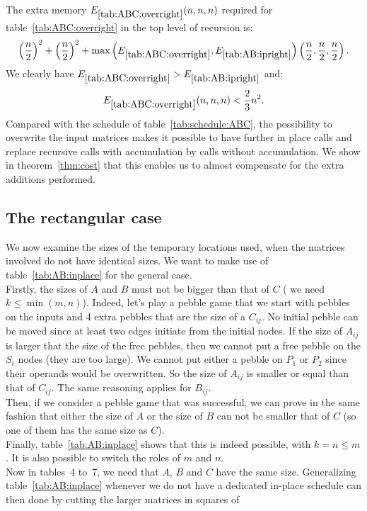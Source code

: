 \documentclass{article}
\renewcommand{\leq}{\leqslant}
\begin{document}
The extra memory $E_{\ref{tab:ABC:overright}}(n,n,n)$ required for table~\ref{tab:ABC:overright} in the top level of recursion is:
$$
\left(\frac{n}{2}\right)^2 + \left(\frac{n}{2}\right)^2 + \max{\left(E_{\ref{tab:ABC:overright}},E_{\ref{tab:AB:ipright}}\right)}\left(\frac{n}{2},\frac{n}{2},\frac{n}{2}\right).
$$
We clearly have $E_{\ref{tab:ABC:overright}}>E_{\ref{tab:AB:ipright}}$ and:  
$$
E_{\ref{tab:ABC:overright}}(n,n,n) < \frac{2}{3}n^2.
$$
 Compared with the schedule of table~\ref{tab:schedule:ABC}, the
 possibility to
 overwrite the input matrices makes it possible to have further in place
 calls and replace recursive calls with accumulation by calls without
 accumulation. We show in theorem~\ref{thm:cost} that this enables us to
 almost compensate for the extra additions performed.

\subsection{The rectangular case}\label{ssec:overwrite:gen}
We now examine the sizes of the temporary locations used, when the
matrices involved do not have identical sizes. We want to make use of
table~\ref{tab:AB:inplace} for the general case.\\
Firstly, the sizes of $A$ and $B$ must not be bigger than that of $C$ (\ie{} we need $k \leq \min{(m,n)}$). Indeed, let's play a pebble game that we start with pebbles on the inputs and  $4$ extra pebbles that are the size of a $C_{ij}$. No initial pebble can be moved since at least two edges initiate from the initial nodes. If the size of $A_{ij}$ is larger that the size of the free pebbles, then we cannot put a free pebble on the $S_i$ nodes (they are too large). We cannot put either a pebble on $P_1$ or $P_2$ since their operands would be overwritten. So the size of $A_{ij}$ is smaller or equal than that of $C_{ij}$. The same reasoning applies for $B_{ij}$.\\ 
Then, if we consider a pebble game that was successful, we can prove in the same fashion that either the size of $A$ or the size of $B$ can not be smaller that of $C$ (so one of them has the same size as $C$).\\
Finally, table~\ref{tab:AB:inplace} shows that this is indeed possible, with
$k=n\leq m$. It is also possible  to switch the roles of $m$ and $n$. \\
Now in tables~4 to~7, we need that $A$, $B$ and $C$ have the same size.
Generalizing table~\ref{tab:AB:inplace} whenever we do not have a dedicated
in-place schedule can then done by cutting the larger matrices in squares of
\end{document}
